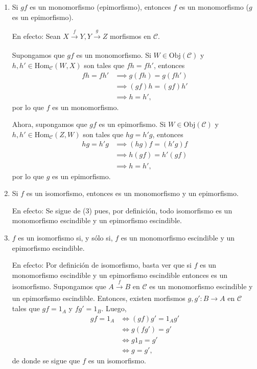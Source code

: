 \documentclass[tesis]{subfiles}
\begin{document}
\begin{Obs}
\begin{enumerate}[label=(\arabic*)]
        \item Si $gf$ es un monomorfismo (epimorfismo), entonces $f$ es un monomorfismo ($g$ es un epimorfismo).

            En efecto: Sean $X\xrightarrow[]{f} Y, Y\xrightarrow[]{g} Z$ morfismos en $\mathscr{C}$.

            Supongamos que $gf$ es un monomorfismo. Si $W\in\text{Obj}(\mathscr{C})$ y $h,h'\in\text{Hom}_\mathscr{C}(W,X)$ son tales que $fh = fh'$, entonces
            \begin{align*}
                fh = fh' &\implies g(fh) = g(fh') \\
                &\implies (gf)h = (gf)h' \\
                               &\implies h = h', \tag{$gf$ es un monomorfismo}
            \end{align*}
            por lo que $f$ es un monomorfismo.

            Ahora, supongamos que $gf$ es un epimorfismo. Si $W\in\text{Obj}(\mathscr{C})$ y $h,h'\in\text{Hom}_\mathscr{C}(Z,W)$ son tales que $hg = h'g$, entonces
            \begin{align*}
                hg = h'g &\implies (hg)f = (h'g)f \\
                &\implies h(gf) = h'(gf) \\
                               &\implies h = h', \tag{$gf$ es un epimorfismo}
            \end{align*}
            por lo que $g$ es un epimorfismo.

        \item Si $f$ es un isomorfismo, entonces es un monomorfismo y un epimorfismo.

            En efecto: Se sigue de (3) pues, por definición, todo isomorfismo es un monomorfismo escindible y un epimorfismo escindible.

        \item $f$ es un isomorfismo si, y sólo si, $f$ es un monomorfismo escindible y un epimorfismo escindible.

            En efecto: Por definición de isomorfismo, basta ver que si $f$ es un monomorfismo escindible y un epimorfismo escindible entonces es un isomorfismo. Supongamos que $A\xrightarrow[]{f} B$ en $\mathscr{C}$ es un monomorfismo escindible y un epimorfismo escindible. Entonces, existen morfismos $g,g':B\to A$ en $\mathscr{C}$ tales que $gf = 1_A$ y $fg' = 1_B$. Luego,
            \begin{align*}
                gf = 1_A &\iff (gf)g' = 1_Ag' \\
                         &\iff g(fg') = g' \\
                         &\iff g1_B = g' \\
                         &\iff g = g',
            \end{align*}
            de donde se sigue que $f$ es un isomorfismo.


\end{enumerate}
\end{Obs}
\end{document}
